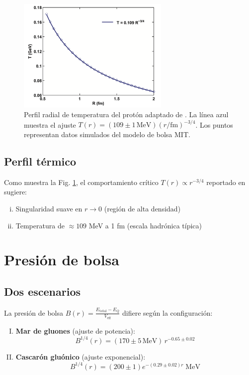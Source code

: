 \begin{figure}[h]
    \centering
    \includegraphics[width=0.65\textwidth]{./Images/T(R).png}
    \caption{
    Perfil radial de temperatura del protón adaptado de \cite{tan2019}. 
    La línea azul muestra el ajuste $T(r) = (109 \pm 1\,\text{MeV})\left(r/\text{fm}\right)^{-3/4}$.
    Los puntos representan datos simulados del modelo de bolsa MIT.
    }
    \label{fig:Tprofile}
\end{figure}

\subsection{Perfil térmico}
Como muestra la Fig. \ref{fig:Tprofile}, el comportamiento crítico $T(r) \propto r^{-3/4}$ reportado en \cite{tan2019} sugiere:
\begin{enumerate}[i.]
    \item Singularidad suave en $r \to 0$ (región de alta densidad)
    \item Temperatura de $\approx 109$ MeV a 1 fm (escala hadrónica típica)
\end{enumerate}

\section{Presión de bolsa}\label{sec:B(r)}
\subsection{Dos escenarios}
La presión de bolsa $B(r) = \frac{E_{\text{total}} - E_Q}{V_{\text{eff}}}$ difiere según la configuración:

\begin{enumerate}[I.]
    \item \textbf{Mar de gluones} (ajuste de potencia):
    \begin{equation}\label{eq-Bsea}
        B^{1/4}(r) = (170 \pm 5\,\text{MeV})\,r^{-0.65 \pm 0.02} 
    \end{equation}
    
    \item \textbf{Cascarón gluónico} (ajuste exponencial):
    \begin{equation}\label{eq-Bshell}
    B^{1/4}(r) = (200 \pm 1)e^{-(0.29 \pm 0.02)r}\;\text{MeV}
    \end{equation}
\end{enumerate}

